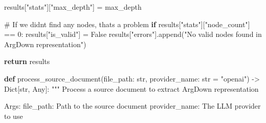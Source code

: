 \documentclass[
  11pt,
  letterpaper,
]{book}
\newenvironment{Shaded}{\begin{snugshade}}{\end{snugshade}}
\newcommand{\BuiltInTok}[1]{\textcolor[rgb]{0.00,0.23,0.31}{#1}}
\newcommand{\CommentTok}[1]{\textcolor[rgb]{0.37,0.37,0.37}{#1}}
\newcommand{\ControlFlowTok}[1]{\textcolor[rgb]{0.00,0.23,0.31}{\textbf{#1}}}
\newcommand{\DecValTok}[1]{\textcolor[rgb]{0.68,0.00,0.00}{#1}}
\newcommand{\KeywordTok}[1]{\textcolor[rgb]{0.00,0.23,0.31}{\textbf{#1}}}
\newcommand{\NormalTok}[1]{\textcolor[rgb]{0.00,0.23,0.31}{#1}}
\newcommand{\OperatorTok}[1]{\textcolor[rgb]{0.37,0.37,0.37}{#1}}
\newcommand{\StringTok}[1]{\textcolor[rgb]{0.13,0.47,0.30}{#1}}
\newcommand{\VariableTok}[1]{\textcolor[rgb]{0.07,0.07,0.07}{#1}}
\begin{document}
\begin{Shaded}
\begin{Highlighting}[]
\NormalTok{    results[}\StringTok{"stats"}\NormalTok{][}\StringTok{"max\_depth"}\NormalTok{] }\OperatorTok{=}\NormalTok{ max\_depth}

    \CommentTok{\# If we didn\textquotesingle{}t find any nodes, that\textquotesingle{}s a problem}
    \ControlFlowTok{if}\NormalTok{ results[}\StringTok{"stats"}\NormalTok{][}\StringTok{"node\_count"}\NormalTok{] }\OperatorTok{==} \DecValTok{0}\NormalTok{:}
\NormalTok{        results[}\StringTok{"is\_valid"}\NormalTok{] }\OperatorTok{=} \VariableTok{False}
\NormalTok{        results[}\StringTok{"errors"}\NormalTok{].append(}\StringTok{"No valid nodes found in ArgDown representation"}\NormalTok{)}

    \ControlFlowTok{return}\NormalTok{ results}

\KeywordTok{def}\NormalTok{ process\_source\_document(file\_path: }\BuiltInTok{str}\NormalTok{, provider\_name: }\BuiltInTok{str} \OperatorTok{=} \StringTok{"openai"}\NormalTok{) }\OperatorTok{{-}\textgreater{}}\NormalTok{ Dict[}\BuiltInTok{str}\NormalTok{, Any]:}
    \CommentTok{"""}
\CommentTok{    Process a source document to extract ArgDown representation}

\CommentTok{    Args:}
\CommentTok{        file\_path: Path to the source document}
\CommentTok{        provider\_name: The LLM provider to use}


\end{Highlighting}
\end{Shaded}
\end{document}
